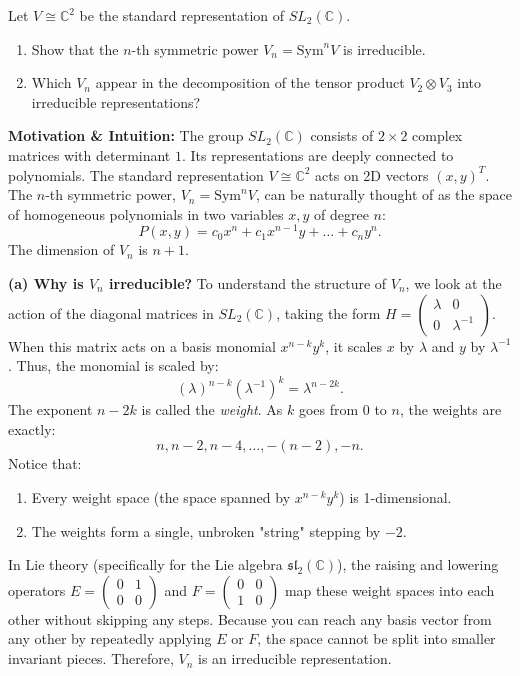 \begin{exercise}
\label{algebra:2010:12}
Let $V \cong \mathbb{C}^2$ be the standard representation of $SL_2(\mathbb{C})$.
\begin{enumerate}
    \item Show that the $n$-th symmetric power $V_n = \mathrm{Sym}^n V$ is irreducible.
    \item Which $V_n$ appear in the decomposition of the tensor product $V_2 \otimes V_3$ into irreducible representations?
\end{enumerate}
\end{exercise}

\begin{solution}
\textbf{Motivation \& Intuition:}
The group $SL_2(\mathbb{C})$ consists of $2 \times 2$ complex matrices with determinant $1$. Its representations are deeply connected to polynomials. The standard representation $V \cong \mathbb{C}^2$ acts on 2D vectors $(x, y)^T$. The $n$-th symmetric power, $V_n = \mathrm{Sym}^n V$, can be naturally thought of as the space of homogeneous polynomials in two variables $x, y$ of degree $n$:
$$P(x, y) = c_0 x^n + c_1 x^{n-1}y + \dots + c_n y^n.$$
The dimension of $V_n$ is $n+1$.

\textbf{(a) Why is $V_n$ irreducible?}
To understand the structure of $V_n$, we look at the action of the diagonal matrices in $SL_2(\mathbb{C})$, taking the form $H = \begin{pmatrix} \lambda & 0 \\ 0 & \lambda^{-1} \end{pmatrix}$. 
When this matrix acts on a basis monomial $x^{n-k}y^k$, it scales $x$ by $\lambda$ and $y$ by $\lambda^{-1}$. Thus, the monomial is scaled by:
$$(\lambda)^{n-k} (\lambda^{-1})^k = \lambda^{n-2k}.$$
The exponent $n-2k$ is called the \textit{weight}. As $k$ goes from $0$ to $n$, the weights are exactly:
$$n, n-2, n-4, \dots, -(n-2), -n.$$
Notice that:
\begin{enumerate}
    \item Every weight space (the space spanned by $x^{n-k}y^k$) is 1-dimensional.
    \item The weights form a single, unbroken "string" stepping by $-2$.
\end{enumerate}

In Lie theory (specifically for the Lie algebra $\mathfrak{sl}_2(\mathbb{C})$), the raising and lowering operators $E = \begin{pmatrix} 0 & 1 \\ 0 & 0 \end{pmatrix}$ and $F = \begin{pmatrix} 0 & 0 \\ 1 & 0 \end{pmatrix}$ map these weight spaces into each other without skipping any steps. Because you can reach any basis vector from any other by repeatedly applying $E$ or $F$, the space cannot be split into smaller invariant pieces. Therefore, $V_n$ is an irreducible representation.


\end{solution}
